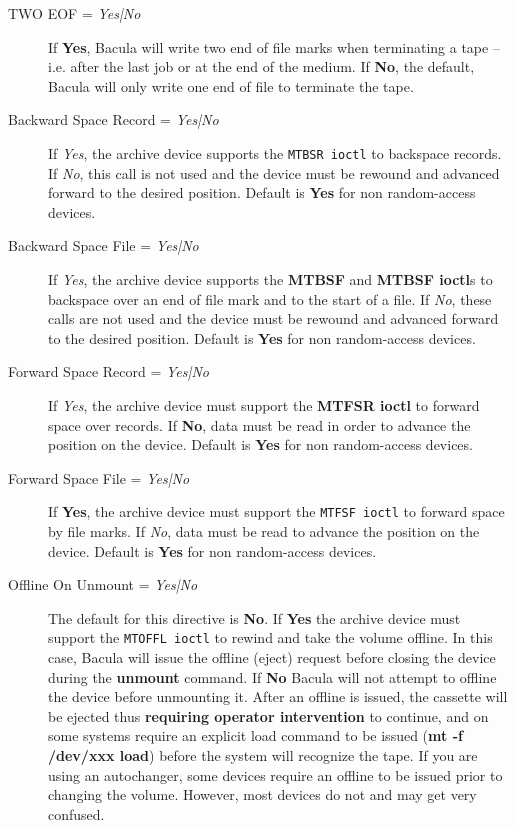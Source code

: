 \begin{description}
\item [TWO EOF = {\it Yes|No}]
   If {\bf Yes}, Bacula will write two end of file marks when  terminating a tape
-- i.e. after the last job or at the end of  the medium. If {\bf No}, the
default, Bacula will only write  one end of file to terminate the tape. 

\item [Backward Space Record = {\it Yes|No}]
   If {\it Yes}, the archive device supports the {\tt MTBSR  ioctl} to backspace
records. If {\it No}, this call is not  used and the device must be rewound
and advanced forward to the  desired position. Default is {\bf Yes} for non
random-access  devices. 

\item [Backward Space File = {\it Yes|No}]
   If {\it Yes}, the archive device supports the {\bf MTBSF} and  {\bf MTBSF
ioctl}s to backspace over an end of file mark and to the  start of a file. If
{\it No}, these calls are not used and the  device must be rewound and
advanced forward to the desired position.  Default is {\bf Yes} for non
random-access devices. 

\item [Forward Space Record = {\it Yes|No}]
   If {\it Yes}, the archive device must support the {\bf MTFSR  ioctl} to
forward space over records. If {\bf No}, data must  be read in order to
advance the position on the device. Default is  {\bf Yes} for non
random-access devices. 

\item [Forward Space File = {\it Yes|No}]
   If {\bf Yes}, the archive device must support the {\tt MTFSF  ioctl} to
forward space by file marks. If {\it No}, data  must be read to advance the
position on the device. Default is  {\bf Yes} for non random-access devices. 

\item [Offline On Unmount = {\it Yes|No}]
   The default for this directive is {\bf No}. If {\bf Yes} the  archive device
must support the {\tt MTOFFL ioctl} to rewind and  take the volume offline. In
this case, Bacula will issue the  offline (eject) request before closing the
device during the {\bf unmount}  command. If {\bf No} Bacula will not attempt
to offline the  device before unmounting it. After an offline is issued,  the
cassette will be ejected thus {\bf requiring operator intervention}  to
continue, and on some systems require an explicit load command  to be issued
({\bf mt -f /dev/xxx load}) before the system will recognize  the tape. If you
are using an autochanger, some devices  require an offline to be issued prior
to changing the volume. However,  most devices do not and may get very
confused.  


\end{description}
